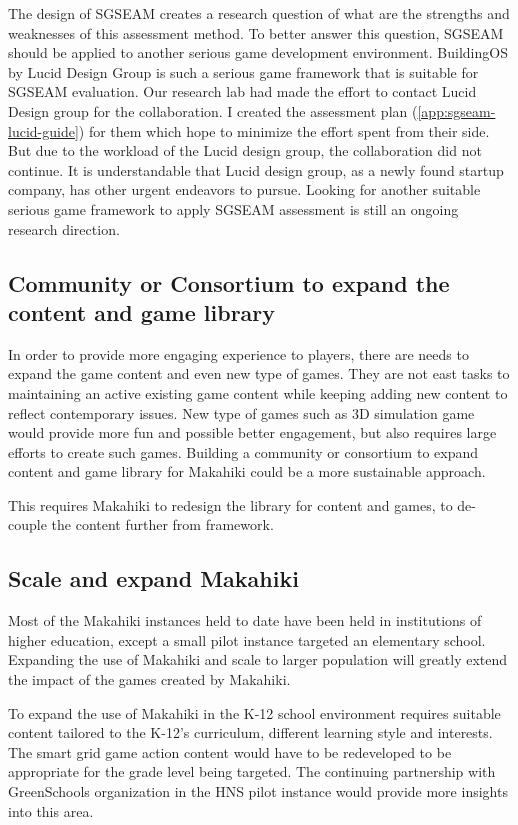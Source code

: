 The design of SGSEAM creates a research question of what are the strengths and weaknesses of this assessment method. To better answer this question, SGSEAM should be applied to another serious game development environment. BuildingOS\cite{building-dashboard} by Lucid Design Group is such a serious game framework that is suitable for SGSEAM evaluation. Our research lab had made the effort to contact Lucid Design group for the collaboration. I created the assessment plan (\autoref{app:sgseam-lucid-guide}) for them which hope to minimize the effort spent from their side. But due to the workload of the Lucid design group, the collaboration did not continue. It is understandable that Lucid design group, as a newly found startup company, has other urgent endeavors to pursue. Looking for another suitable serious game framework to apply SGSEAM assessment is still an ongoing research direction.

\subsection{Community or Consortium to expand the content and game library}

In order to provide more engaging experience to players, there are needs to expand the game content and even new type of games. They are not east tasks to maintaining an active existing game content while keeping adding new content to reflect contemporary issues. New type of games such as 3D simulation game would provide more fun and possible better engagement, but also requires large efforts to create such games. Building a community or consortium to expand content and game library for Makahiki could be a more sustainable approach. 

This requires Makahiki to redesign the library for content and games, to de-couple  the content further from framework.

\subsection{Scale and expand Makahiki}

Most of the Makahiki instances held to date have been held in institutions of higher education, except a small pilot instance targeted an elementary school. Expanding the use of Makahiki and scale to larger population will greatly extend the impact of the games created by Makahiki.

To expand the use of Makahiki in the K-12 school environment requires suitable content tailored to the K-12's curriculum, different learning style and interests. The smart grid game action content would have to be redeveloped to be appropriate for the grade level being targeted. The continuing partnership with GreenSchools organization in the HNS pilot instance would provide more insights into this area.

